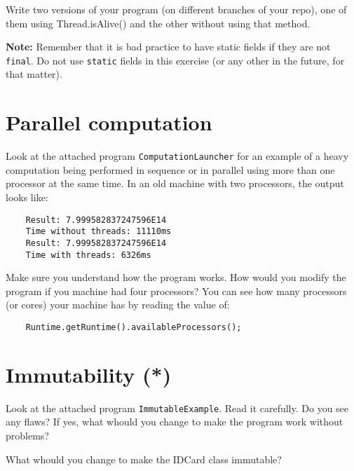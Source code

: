 \documentclass{article}
\begin{document}
Write two versions of your program (on different branches of your
repo), one of them using Thread.isAlive() and the other without using
that method. 

\textbf{Note:} Remember that it is bad practice to have static fields if they
are not \verb+final+. Do not use \verb+static+ fields in this exercise
(or any other in the future, for that matter).


\section{Parallel computation}
\label{sec:parallel-computation}

% 

Look at the attached program \verb+ComputationLauncher+ for an example
of a heavy computation being performed in sequence or in parallel
using more than one processor at the same time. In an old machine with
two processors, the output looks like: 

\begin{verbatim}
    Result: 7.999582837247596E14
    Time without threads: 11110ms
    Result: 7.999582837247596E14
    Time with threads: 6326ms
\end{verbatim}

Make sure you understand how the program works. How would you modify
the program if you machine had four processors? You can see how many
processors (or cores) your machine has by reading the value of: 

\begin{verbatim}
    Runtime.getRuntime().availableProcessors();
\end{verbatim}

\section{Immutability (*)}
\label{sec:immutability}

Look at the attached program \verb+ImmutableExample+. Read it
carefully. Do you see any flaws? If yes, what whould you change to
make the program work without problems?

What whould you change to make the IDCard class immutable?
\end{document}
